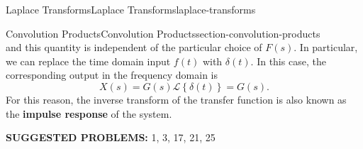 \documentclass[oneside,10pt,]{book}
\newcommand{\terminology}[1]{\textbf{#1}}
\numberwithin{equation}{section}
\newcommand{\Laplace}[1]{\mathcal{L}\left\{#1\right\}}
\begin{document}
\begin{chapterptx}{Laplace Transforms}{}{Laplace Transforms}{}{}{laplace-transforms}
\begin{sectionptx}{Convolution Products}{}{Convolution Products}{}{}{section-convolution-products}
\begin{equation*}
\end{equation*}
and this quantity is independent of the particular choice of \(F(s)\). In particular, we can replace the time domain input \(f(t)\) with \(\delta(t)\). In this case, the corresponding output in the frequency domain is%
\begin{equation*}
X(s) = G(s)\Laplace{\delta(t)} = G(s)\text{.}
\end{equation*}
For this reason, the inverse transform of the transfer function is also known as the \terminology{impulse response} of the system.%
\par
\hypertarget{p-568}{}%
\terminology{SUGGESTED PROBLEMS:} 1, 3, 17, 21, 25%
\end{sectionptx}
\end{chapterptx}
%
%
\typeout{************************************************}
\typeout{************************************************}
%
\end{document}
